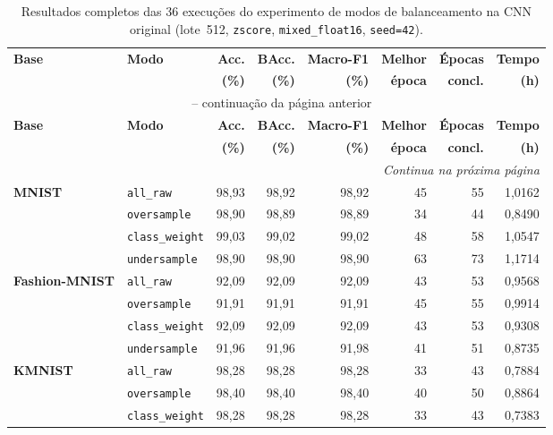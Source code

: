 \documentclass[
    12pt,
    openright,
    oneside,
    a4paper,
    english,
    brazil
]{abntex2}
\begin{document}
{\footnotesize
\setlength{\tabcolsep}{3.5pt}
\begin{longtable}{llrrrrrr}
\caption{Resultados completos das 36 execuções do experimento de modos de balanceamento na CNN original (lote~512, \texttt{zscore}, \texttt{mixed\_float16}, \texttt{seed=42}).}
\label{tab:resultados_36_balanceamento} \\
\toprule
\textbf{Base} & \textbf{Modo} & \textbf{Acc.} & \textbf{BAcc.} & \textbf{Macro-F1} & \textbf{Melhor} & \textbf{Épocas} & \textbf{Tempo} \\
 &  & \textbf{(\%)} & \textbf{(\%)} & \textbf{(\%)} & \textbf{época} & \textbf{concl.} & \textbf{(h)} \\
\midrule
\endfirsthead
\multicolumn{8}{c}{{\tablename\ \thetable{} -- continuação da página anterior}} \\
\toprule
\textbf{Base} & \textbf{Modo} & \textbf{Acc.} & \textbf{BAcc.} & \textbf{Macro-F1} & \textbf{Melhor} & \textbf{Épocas} & \textbf{Tempo} \\
 &  & \textbf{(\%)} & \textbf{(\%)} & \textbf{(\%)} & \textbf{época} & \textbf{concl.} & \textbf{(h)} \\
\midrule
\endhead
\midrule \multicolumn{8}{r}{\footnotesize\textit{Continua na próxima página}} \\
\bottomrule
\endfoot
\bottomrule
\endlastfoot
\textbf{MNIST} & \texttt{all\_raw} & 98,93 & 98,92 & 98,92 & 45 & 55 & 1,0162 \\
 & \texttt{oversample} & 98,90 & 98,89 & 98,89 & 34 & 44 & 0,8490 \\
 & \texttt{class\_weight} & 99,03 & 99,02 & 99,02 & 48 & 58 & 1,0547 \\
 & \texttt{undersample} & 98,90 & 98,90 & 98,90 & 63 & 73 & 1,1714 \\
\midrule
\textbf{Fashion-MNIST} & \texttt{all\_raw} & 92,09 & 92,09 & 92,09 & 43 & 53 & 0,9568 \\
 & \texttt{oversample} & 91,91 & 91,91 & 91,91 & 45 & 55 & 0,9914 \\
 & \texttt{class\_weight} & 92,09 & 92,09 & 92,09 & 43 & 53 & 0,9308 \\
 & \texttt{undersample} & 91,96 & 91,96 & 91,98 & 41 & 51 & 0,8735 \\
\midrule
\textbf{KMNIST} & \texttt{all\_raw} & 98,28 & 98,28 & 98,28 & 33 & 43 & 0,7884 \\
 & \texttt{oversample} & 98,40 & 98,40 & 98,40 & 40 & 50 & 0,8864 \\
 & \texttt{class\_weight} & 98,28 & 98,28 & 98,28 & 33 & 43 & 0,7383 \\

\end{longtable}}
\end{document}
